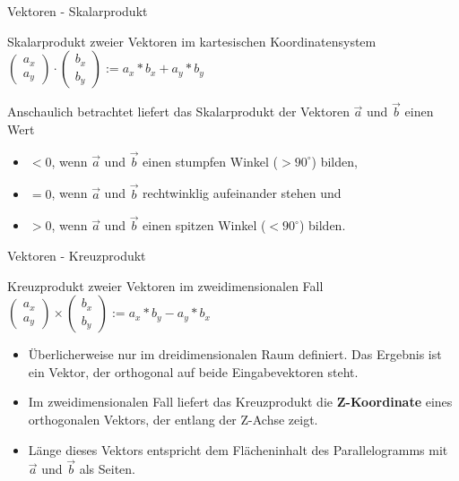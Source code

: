 \begin{frame}{Vektoren - Skalarprodukt}
	\begin{block}{Skalarprodukt zweier Vektoren im kartesischen Koordinatensystem}
		$\left(\begin{array}{c} a_x \\ a_y \end{array}\right) \cdot \left(\begin{array}{c} b_x \\ b_y \end{array}\right) := a_x * b_x + a_y * b_y$
	\end{block}
	
	Anschaulich betrachtet liefert das Skalarprodukt der Vektoren $\overrightarrow{a}$ und $\overrightarrow{b}$ einen Wert
	\begin{itemize}
		\item $< 0$, wenn $\overrightarrow{a}$ und $\overrightarrow{b}$ einen stumpfen Winkel ($> 90^{\circ}$) bilden,
		\item $= 0$, wenn $\overrightarrow{a}$ und $\overrightarrow{b}$ rechtwinklig aufeinander stehen und
		\item $> 0$, wenn $\overrightarrow{a}$ und $\overrightarrow{b}$ einen spitzen Winkel ($< 90^{\circ}$) bilden.
	\end{itemize}
\end{frame}

\begin{frame}{Vektoren - Kreuzprodukt}
	\begin{block}{Kreuzprodukt zweier Vektoren im zweidimensionalen Fall}
		$\left(\begin{array}{c} a_x \\ a_y \end{array}\right) \times \left(\begin{array}{c} b_x \\ b_y \end{array}\right) := a_x * b_y - a_y * b_x$
	\end{block}
	
	\begin{itemize}
		\item Überlicherweise nur im dreidimensionalen Raum definiert. Das Ergebnis ist ein Vektor, der orthogonal auf beide Eingabevektoren steht.
		\item Im zweidimensionalen Fall liefert das Kreuzprodukt die {\bf Z-Koordinate} eines orthogonalen Vektors, der entlang der Z-Achse zeigt.
		\item Länge dieses Vektors entspricht dem Flächeninhalt des Parallelogramms mit $\overrightarrow{a}$ und $\overrightarrow{b}$ als Seiten.
	\end{itemize}
\end{frame}

